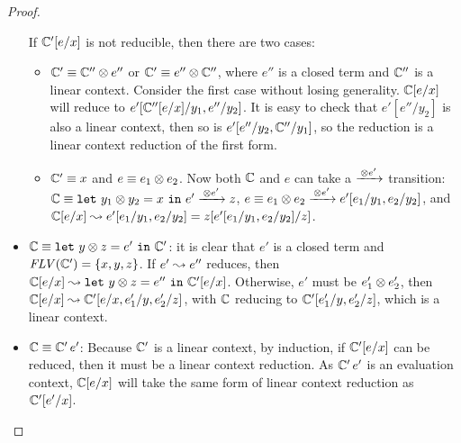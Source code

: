 \documentclass[10pt,a4]{article}
\begin{document}
\begin{proof}
\begin{itemize}
  If $\mathbb{C}'[e/x]$ is not reducible, then there are two cases:
  \begin{itemize}
  \item $\mathbb{C}' \equiv \mathbb{C}'' \otimes e''$ or $\mathbb{C}' \equiv e'' \otimes \mathbb{C}''$,
    where $e''$ is a closed term and $\mathbb{C}''$ is a linear context. 
    Consider the first case without losing generality. $\mathbb{C}[e/x]$ will reduce to 
    $e'[\mathbb{C}''[e/x] / y_1, e'' / y_2]$. It is easy to check that $e'[e''/y_2]$ is also a linear context, 
    then so is $e'[e''/y_2, \mathbb{C}'' / y_1]$, so the reduction is a linear context reduction of 
    the first form.
  \item $\mathbb{C}' \equiv x$ and $e \equiv e_1 \otimes e_2$. Now both $\mathbb{C}$ and $e$ can take a 
    $\xrightarrow{\,{\otimes e'}\,}$ transition: 
    $\mathbb{C} \equiv \mathtt{let} \ {y_1 \otimes y_2} = {x} \ \mathtt{in} \ {e'} \xrightarrow{\,{\otimes e'}\,} z$, 
    $e \equiv e_1 \otimes e_2 \xrightarrow{\,{\otimes e'}\,} e'[e_1/y_1, e_2/y_2]$, and 
    $\mathbb{C}[e/x] \leadsto e'[e_1/y_1, e_2/y_2] = z [e'[e_1/y_1, e_2/y_2]/z]$.
  \end{itemize}
\item $\mathbb{C} \equiv \mathtt{let} \ {y \otimes z} = {e'} \ \mathtt{in} \ {\mathbb{C}'}$: 
  it is clear that $e'$ is a closed term and $\mathit{FLV}(\mathbb{C}') = \{{x, y, z}\}$.
  If $e' \leadsto e''$ reduces, then $\mathbb{C}[e/x] \leadsto \mathtt{let} \ {y \otimes z} = {e''} \ \mathtt{in} \ {\mathbb{C}'[e/x]}$. 
  Otherwise, $e'$ must be $e_1' \otimes e_2'$, then 
  $\mathbb{C}[e/x] \leadsto \mathbb{C}'[e/x, e_1'/y, e_2'/z]$, with $\mathbb{C}$ reducing to 
  $\mathbb{C}'[e_1'/y, e_2'/z]$, which is a linear context.
\item $\mathbb{C} \equiv \mathbb{C}' \, e'$: 
  Because $\mathbb{C}'$ is a linear context, by induction, if $\mathbb{C}'[e/x]$ can be reduced, then 
  it must be a linear context reduction. As $\mathbb{C}'\,e'$ is an evaluation context, $\mathbb{C}[e/x]$ 
  will take the same form of linear context reduction as $\mathbb{C}'[e'/x]$.


\end{itemize}
\end{proof}
\end{document}
